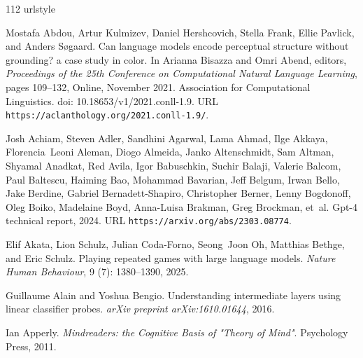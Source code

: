 \begin{thebibliography}{112}
\providecommand{\natexlab}[1]{#1}
\providecommand{\url}[1]{\texttt{#1}}
\expandafter\ifx\csname urlstyle\endcsname\relax
  \providecommand{\doi}[1]{doi: #1}\else
  \providecommand{\doi}{doi: \begingroup \urlstyle{rm}\Url}\fi

Mostafa Abdou, Artur Kulmizev, Daniel Hershcovich, Stella Frank, Ellie Pavlick, and Anders S{\o}gaard.
\newblock Can language models encode perceptual structure without grounding? a case study in color.
\newblock In Arianna Bisazza and Omri Abend, editors, \emph{Proceedings of the 25th Conference on Computational Natural Language Learning}, pages 109--132, Online, November 2021. Association for Computational Linguistics.
\newblock \doi{10.18653/v1/2021.conll-1.9}.
\newblock URL \url{https://aclanthology.org/2021.conll-1.9/}.

Josh Achiam, Steven Adler, Sandhini Agarwal, Lama Ahmad, Ilge Akkaya, Florencia~Leoni Aleman, Diogo Almeida, Janko Altenschmidt, Sam Altman, Shyamal Anadkat, Red Avila, Igor Babuschkin, Suchir Balaji, Valerie Balcom, Paul Baltescu, Haiming Bao, Mohammad Bavarian, Jeff Belgum, Irwan Bello, Jake Berdine, Gabriel Bernadett-Shapiro, Christopher Berner, Lenny Bogdonoff, Oleg Boiko, Madelaine Boyd, Anna-Luisa Brakman, Greg Brockman, et~al.
\newblock Gpt-4 technical report, 2024.
\newblock URL \url{https://arxiv.org/abs/2303.08774}.

Elif Akata, Lion Schulz, Julian Coda-Forno, Seong~Joon Oh, Matthias Bethge, and Eric Schulz.
\newblock Playing repeated games with large language models.
\newblock \emph{Nature Human Behaviour}, 9 (7): 1380--1390, 2025.

Guillaume Alain and Yoshua Bengio.
\newblock Understanding intermediate layers using linear classifier probes.
\newblock \emph{arXiv preprint arXiv:1610.01644}, 2016.

Ian Apperly.
\newblock \emph{{Mindreaders: the Cognitive Basis of "Theory of Mind"}}.
\newblock Psychology Press, 2011.


\end{thebibliography}
